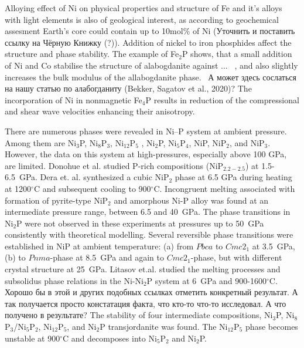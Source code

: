 \documentclass[twoside,twocolumn,9pt]{article}
\begin{document}
Alloying effect of Ni on physical properties and structure of Fe and it's alloys with light elements is also of geological interest, as according to geochemical assesment Earth's core could contain up to 10mol\% of Ni \cite{} {\color{red}(Уточнить и поставить ссылку на Чёрную Книжку (?))}.
Addition of nickel to iron phosphides affect the structure and phase stability. 
The example of Fe$_2$P shows, that a small addition of Ni and Co stabilise the structure of alabogdanite against ... ~\cite{Britvin-2002, Buseck1969, Nisar-2010-EPSL}, and also slightly increases the  bulk modulus of the allabogdanite phase.~\cite{Nisar-2010-EPSL} 
А может здесь сослаться на нашу статью по алабогданиту (Bekker, Sagatov et al., 2020)?
The incorporation of Ni in nonmagnetic Fe$_4$P results in reduction of the compressional and shear wave velocities enhancing their anisotropy.\cite{Wu-2011-GRL}

There are numerous phases were revealed in Ni--P system at ambient pressure. 
Among them are Ni$_3$P, Ni$_8$P$_3$, Ni$_{12}$P$_5$ , Ni$_2$P, Ni$_5$P$_4$, NiP, NiP$_2$, and NiP$_3$. 
However, the data on this system at high-pressures, especially above 100 GPa, are limited.
Donohue et al.\cite{Donohue-1968} studied P-rich compositions (NiP$_{2.2-2.5}$) at 1.5-6.5~GPa. 
Dera et. al.\cite{Dera-2009-JGR} synthesized a cubic NiP$_2$ phase at 6.5 GPa during heating at 1200$^\circ$C and subsequent cooling to 900$^\circ$C. 
Incongruent melting associated with formation of pyrite-type NiP$_2$ and amorphous Ni-P alloy was found at an intermediate pressure range, between 6.5 and 40~GPa.
The phase transitions in Ni$_2$P were not observed in these experiments at pressures up to 50~GPa consistently with theoretical modelling.\cite{Nisar-2010-EPSL}
Several reversible phase transitions were established in NiP at ambient temperature: (a) from $Pbca$ to $Cmc2_1$ at 3.5~GPa, (b) to $Pnma$-phase at 8.5~GPa and again to $Cmc2_1$-phase, but with different crystal structure at 25~GPa.\cite{Dera-2011-JSSC, Dera2013-PCM}
{\color{red}Litasov et.al. studied the melting processes and subsolidus phase relations in the Ni-Ni$_2$P system at 6~GPa and 900-1600$^\circ$C.\cite{Litasov-2019-HPR-NiP} 
Хорошо бы в этой и других подобных ссылках отметить конкретный результат. А так получается просто констатация факта, что кто-то что-то исследовал. А что получено в результате?}
The stability of four intermediate compositions, Ni$_3$P, Ni$_8$P$_3$/Ni$_5$P$_2$, Ni$_{12}$P$_5$, and Ni$_2$P transjordanite was found. 
The Ni$_{12}$P$_5$ phase becomes unstable at 900$^\circ$C and decomposes into Ni$_5$P$_2$ and Ni$_2$P. 
\end{document}
